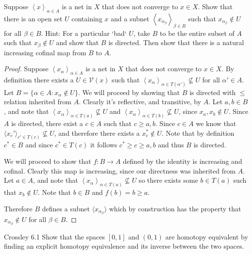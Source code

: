 \documentclass{homework651}
\begin{document}
\begin{problems}
\problem Suppose $\left<x\right>_{\alpha\in A}$ is a net
in $X$ that does not converge to $x\in X$.  Show that
there is an open set $U$ containing $x$ and a subnet
$\left<x_{\alpha_\beta}\right>_{\beta\in B}$ such that
$x_{\alpha_{\beta}}\not\in U$ for all $\beta\in B$.
Hint: For a particular `bad` $U$, 
take $B$ to be the entire subset of $A$ such that
$x_{\beta}\not\in U$ and show that $B$ is directed.
Then show that there is a natural increasing cofinal map
from $B$ to $A$.

\begin{proof}Suppose $\left<x_\alpha\right>_{\alpha\in A}$ is a net
    in $X$ that does not converge to $x\in X$. By definition there exists 
    a $U \in \mathcal{V}(x)$ such that $\left<x_\alpha\right>_{\alpha\in T(\alpha')} \not\subseteq U$ for 
    all $\alpha' \in A$. Let $B = \{\alpha \in A: x_\alpha \not\in U\}$. We will proceed by 
    showing that $B$ is directed with $\leq$ relation inherited from $A$. Clearly it's reflective, 
    and transitive, by $A$. Let $a, b \in B$, and note that $\left<x_\alpha\right>_{\alpha\in T(a)} \not\subseteq U$
    and $\left<x_\alpha\right>_{\alpha\in T(b)} \not\subseteq U$, since $x_a, x_b \not\in U$. Since $A$ is directed, there exist a $c \in A$ 
    such that $c \geq a, b$. Since $c \in A$ we know that $\langle x_c' \rangle_{c' \in T(c)} \not\subseteq U$, and therefore there 
    exists a $x_c^* \not\in U$. Note that by definition $c^* \in B$ and since $c^* \in T(c)$ it follows $c^* \geq c \geq a, b$ and thus $B$ is directed.   
    
    
    We will proceed to show that $f:B \to A$ defined by the identity is increasing and cofinal. Clearly this map is increasing, 
    since our directness was inherited from $A$. Let $a \in A$, and note that  $\left<x_\alpha\right>_{\alpha\in T(a)} \not\subseteq U$
    so there exists some $b \in T(a)$ such that $x_b \not\in U$. Note that $b \in B$ and $f(b) = b \geq a$. 

    Therefore $B$ defines a subnet $\langle x_{\alpha_\beta}\rangle$ which by construction has the property that $x_{\alpha_\beta} \not\in U$
    for all $\beta \in B$. 

\end{proof}




\problem Crossley 6.1
Show that the spaces $[0,1]$ and $(0,1)$ are homotopy equivalent
by finding an explicit homotopy equivalence and its inverse 
between the two spaces.


\end{problems}
\end{document}
